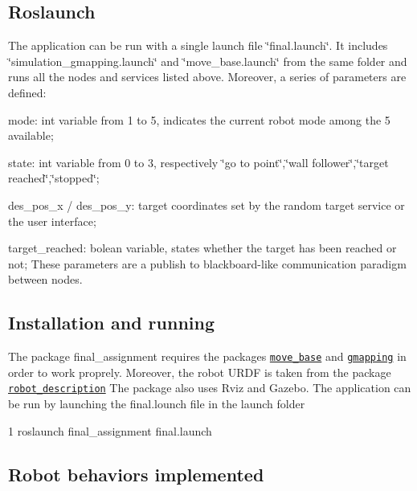 \subsection*{Roslaunch}

The application can be run with a single launch file \char`\"{}final.\+launch\char`\"{}. It includes \char`\"{}simulation\+\_\+gmapping.\+launch\char`\"{} and \char`\"{}move\+\_\+base.\+launch\char`\"{} from the same folder and runs all the nodes and services listed above. Moreover, a series of parameters are defined\+:
\begin{DoxyItemize}
\item mode\+: int variable from 1 to 5, indicates the current robot mode among the 5 available;
\item state\+: int variable from 0 to 3, respectively \char`\"{}go to point\char`\"{},\char`\"{}wall follower\char`\"{},\char`\"{}target reached\char`\"{},\char`\"{}stopped\char`\"{};
\item des\+\_\+pos\+\_\+x / des\+\_\+pos\+\_\+y\+: target coordinates set by the random target service or the user interface;
\item target\+\_\+reached\+: bolean variable, states whether the target has been reached or not; These parameters are a publish to blackboard-\/like communication paradigm between nodes.
\end{DoxyItemize}

\subsection*{Installation and running}

The package final\+\_\+assignment requires the packages \href{http://wiki.ros.org/move_base}{\tt move\+\_\+base} and \href{http://wiki.ros.org/gmapping}{\tt gmapping} in order to work proprely. Moreover, the robot U\+R\+DF is taken from the package \href{https://github.com/CarmineD8/robot_description}{\tt robot\+\_\+description} The package also uses Rviz and Gazebo. The application can be run by launching the final.\+lounch file in the launch folder


\begin{DoxyCode}
1 roslaunch final\_assignment final.launch
\end{DoxyCode}


\subsection*{Robot behaviors implemented}

